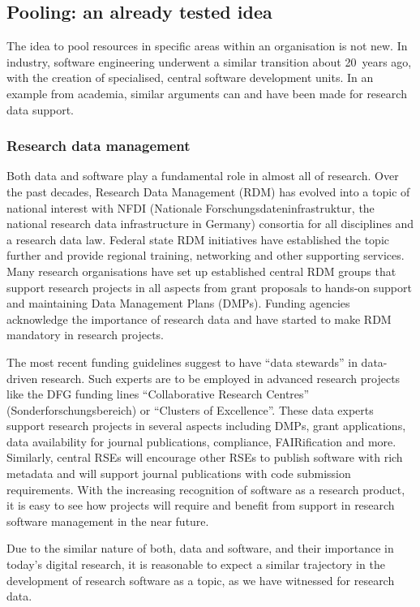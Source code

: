 \documentclass[10pt,letterpaper]{article}
\begin{document}
\subsection*{Pooling: an already tested idea}
The idea to pool resources in specific areas within an organisation is not new.
In industry, software engineering underwent a similar transition about 20 years ago, with the creation of specialised, central software development units.
In an example from academia, similar arguments can and have been made for research data support.

\subsubsection*{Research data management}
Both data and software play a fundamental role in almost all of research.
Over the past decades, Research Data Management (RDM) has evolved into a topic of national interest with NFDI (Nationale Forschungsdateninfrastruktur, the national research data infrastructure in Germany) consortia for all disciplines and a research data law.
Federal state RDM initiatives have established the topic further and provide regional training, networking and other supporting services.
Many research organisations have set up established central RDM groups that support research projects in all aspects from grant proposals to hands-on support and maintaining Data Management Plans (DMPs).
Funding agencies acknowledge the importance of research data and have started to make RDM mandatory in research projects.

The most recent funding guidelines suggest to have “data stewards” in data-driven research.
Such experts are to be employed in advanced research projects like the DFG funding lines “Collaborative Research Centres” (Sonderforschungsbereich) or “Clusters of Excellence”.
These data experts support research projects in several aspects including DMPs, grant applications, data availability for journal publications, compliance, FAIRification and more.
Similarly, central RSEs will encourage other RSEs to publish software with rich metadata and will support journal publications with code submission requirements.
With the increasing recognition of software as a research product, it is easy to see how projects will require and benefit from support in research software management in the near future.

Due to the similar nature of both, data and software, and their importance in today's digital research, it is reasonable to expect a similar trajectory in the development of research software as a topic, as we have witnessed for research data.
\end{document}
